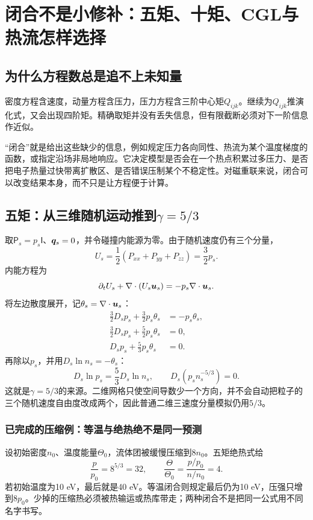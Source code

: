 \chapter{闭合不是小修补：五矩、十矩、CGL与热流怎样选择}
\label{hall:ch:closures}
\section{为什么方程数总是追不上未知量}
密度方程含速度，动量方程含压力，压力方程含三阶中心矩$Q_{ijk}$。继续为$Q_{ijk}$推演化式，又会出现四阶矩。精确取矩并没有丢失信息，但有限截断必须对下一阶信息作近似。

“闭合”就是给出这些缺少的信息，例如规定压力各向同性、热流为某个温度梯度的函数，或指定沿场非局地响应。它决定模型是否会在一个热点积累过多压力、是否把电子热量过快带离扩散区、是否错误压制某个不稳定性。对磁重联来说，闭合可以改变结果本身，而不只是让方程便于计算。\citep{Wang2015,Ng2017,Ng2020}

\section{五矩：从三维随机运动推到\texorpdfstring{$\gamma=5/3$}{gamma=5/3}}
取$\mathsf P_s=p_s\mathsf I$、$\bm{q}_s=0$，并令碰撞内能源为零。由于随机速度仍有三个分量，
\begin{equation}U_s=\frac12(P_{xx}+P_{yy}+P_{zz})=\frac32p_s.\end{equation}
内能方程为
\begin{equation}
\partial_tU_s+\nabla\cdot(U_s\bm{u}_s)=-p_s\nabla\cdot\bm{u}_s.
\end{equation}
将左边散度展开，记$\theta_s=\nabla\cdot\bm{u}_s$：
\begin{align}
\frac32D_sp_s+\frac32p_s\theta_s&=-p_s\theta_s,\\
\frac32D_sp_s+\frac52p_s\theta_s&=0,\\
D_sp_s+\frac53p_s\theta_s&=0.
\end{align}
再除以$p_s$，并用$D_s\ln n_s=-\theta_s$：
\begin{equation}
D_s\ln p_s=\frac53D_s\ln n_s,
\qquad D_s(p_sn_s^{-5/3})=0.
\end{equation}
这就是$\gamma=5/3$的来源。二维网格只使空间导数少一个方向，并不会自动把粒子的三个随机速度自由度改成两个，因此普通二维三速度分量模拟仍用$5/3$。

\subsection{已完成的压缩例：等温与绝热绝不是同一预测}
设初始密度$n_0$、温度能量$\Theta_0$，流体团被缓慢压缩到$8n_0$。五矩绝热式给
\begin{equation}
\frac p{p_0}=8^{5/3}=32,\qquad
\frac\Theta{\Theta_0}=\frac{p/p_0}{n/n_0}=4.
\end{equation}
若初始温度为10 eV，最后就是40 eV。等温闭合则规定最后仍为10 eV，压强只增到$8p_0$。少掉的压缩热必须被热输运或热库带走；两种闭合不是把同一公式用不同名字书写。

